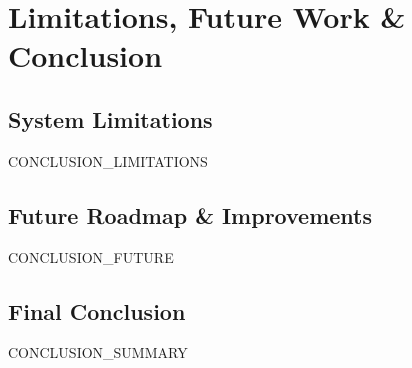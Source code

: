 
\chapter{Limitations, Future Work \& Conclusion}

\section{System Limitations}
{{CONCLUSION_LIMITATIONS}}

\section{Future Roadmap \& Improvements}
{{CONCLUSION_FUTURE}}

\section{Final Conclusion}
{{CONCLUSION_SUMMARY}}
